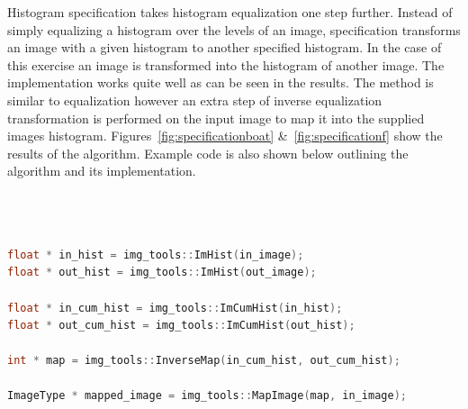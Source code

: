 \documentclass[letterpaper,10pt]{article}
\begin{document}
Histogram specification takes histogram equalization one step further. Instead of simply equalizing a histogram over the levels of an image, specification transforms an image with a given histogram to another specified histogram. In the case of this exercise an image is transformed into the histogram of another image. The implementation works quite well as can be seen in the results. The method is similar to equalization however an extra step of inverse equalization transformation is performed on the input image to map it into the supplied images histogram. Figures~\ref{fig:specificationboat} \&~\ref{fig:specificationf} show the results of the algorithm. Example code is also shown below outlining the algorithm and its implementation.
\\ \\ \\ \\
\begin{lstlisting}[frame=single, language=c++]
float * in_hist = img_tools::ImHist(in_image);
float * out_hist = img_tools::ImHist(out_image);

float * in_cum_hist = img_tools::ImCumHist(in_hist);
float * out_cum_hist = img_tools::ImCumHist(out_hist);

int * map = img_tools::InverseMap(in_cum_hist, out_cum_hist);

ImageType * mapped_image = img_tools::MapImage(map, in_image);
\end{lstlisting}
\end{document}
